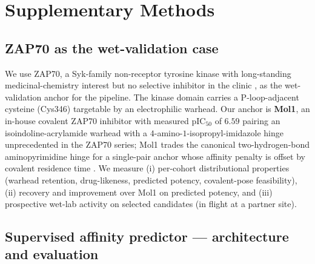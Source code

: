 \section{Supplementary Methods}\label{sec:supp}

\subsection{ZAP70 as the wet-validation case}\label{sec:supp:zap70}

We use ZAP70, a Syk-family non-receptor tyrosine kinase with long-standing medicinal-chemistry interest but no selective inhibitor in the clinic \cite{auyeung2009zap70}, as the wet-validation anchor for the pipeline. The kinase domain carries a P-loop-adjacent cysteine (Cys346) targetable by an electrophilic warhead. Our anchor is \textbf{Mol1}, an in-house covalent ZAP70 inhibitor with measured pIC$_{50}$ of $6.59$ pairing an isoindoline-acrylamide warhead with a $4$-amino-$1$-isopropyl-imidazole hinge unprecedented in the ZAP70 series; Mol1 trades the canonical two-hydrogen-bond aminopyrimidine hinge for a single-pair anchor whose affinity penalty is offset by covalent residence time \cite{copeland2006residence,bradshaw2015reversible}. We measure (i) per-cohort distributional properties (warhead retention, drug-likeness, predicted potency, covalent-pose feasibility), (ii) recovery and improvement over Mol1 on predicted potency, and (iii) prospective wet-lab activity on selected candidates (in flight at a partner site).

\subsection{Supervised affinity predictor — architecture and evaluation}\label{sec:supp:scorer}


